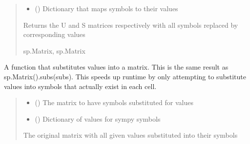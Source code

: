 \documentclass[letterpaper,10pt,english]{sphinxmanual}
\begin{document}
\begin{fulllineitems}
\begin{fulllineitems}
\begin{quote}
\begin{description}
\begin{itemize}
\item {} 
\sphinxAtStartPar
{} () \textendash{} Dictionary that maps symbols to their values

\end{itemize}

\sphinxAtStartPar
Returns the U and S matrices respectively with all symbols replaced by corresponding values

\sphinxAtStartPar
sp.Matrix, sp.Matrix

\end{description}\end{quote}

\end{fulllineitems}


\begin{fulllineitems}
\label{\detokenize{src.sensitivity.faster_sensitivity:src.sensitivity.faster_sensitivity.SensitivityMatrix.matrix_sub}}
\pysigstartsignatures
\pysiglinewithargsret
{}
{\sphinxparamcomma {}}
{}
\pysigstopsignatures
\sphinxAtStartPar
A function that substitutes values into a matrix.
This is the same result as sp.Matrix().subs(subs).
This speeds up runtime by only attempting to substitute values into symbols that actually exist in each cell.
\begin{quote}\begin{description}
\begin{itemize}
\item {} 
\sphinxAtStartPar
{} () \textendash{} The matrix to have symbols substituted for values

\item {} 
\sphinxAtStartPar
{} () \textendash{} Dictionary of values for sympy symbols

\end{itemize}

\sphinxAtStartPar
The original matrix with all given values substituted into their symbols


\end{description}
\end{quote}
\end{fulllineitems}
\end{fulllineitems}
\end{document}
